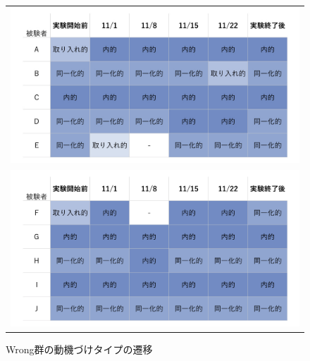 \begin{figure}[htb]
\begin{center}
\begin{tabular}{c}

  \begin{minipage}[htb]{\linewidth}
  \begin{center}
  \includegraphics[width=12cm]{images/7/same_motivation_type.png}
  \caption{Same群の動機づけタイプの遷移}
  \label{tb:same_motivation_type}
  \end{center}
  \end{minipage}

  \\

  \begin{minipage}[htb]{\linewidth}
  \begin{center}
  \includegraphics[width=12cm]{images/7/wrong_motivation_type.png}
  \caption{Wrong群の動機づけタイプの遷移}
  \label{tb:wrong_motivation_type}
  \end{center}
  \end{minipage}

  \\


\end{tabular}
\end{center}
\end{figure}

